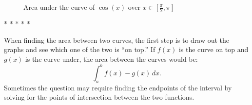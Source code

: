 \documentclass[12pt]{article}
\begin{document}
                \begin{figure}[H]
                    \begin{center}
                        \caption{Area under the curve of $\cos(x)$ over $x \in [\frac{\pi}{2}, \pi]$}
                        \label{fig:auccosx2}
                    \end{center}
                \end{figure}

                \begin{center}
                    * * * * *
                \end{center}

                When finding the area between two curves, the first step is to draw out the graphs and see which one of the two is ``on top.'' If $f(x)$ is the curve on top and $g(x)$ is the curve under, the area between the curves would be:
                \[ \int_a^b f(x) - g(x) \, dx. \]
                Sometimes the question may require finding the endpoints of the interval by solving for the points of intersection between the two functions.
\end{document}
